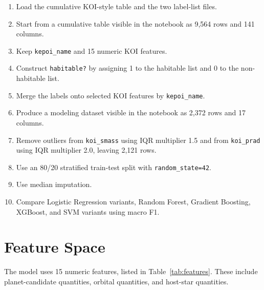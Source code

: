 \documentclass[11pt]{article}
\newcommand{\code}[1]{\texttt{#1}}
\begin{document}
\begin{enumerate}
  \item Load the cumulative KOI-style table and the two label-list files.
  \item Start from a cumulative table visible in the notebook as 9,564 rows and 141 columns.
  \item Keep \code{kepoi\_name} and 15 numeric KOI features.
  \item Construct \code{habitable?} by assigning 1 to the habitable list and 0 to the non-habitable list.
  \item Merge the labels onto selected KOI features by \code{kepoi\_name}.
  \item Produce a modeling dataset visible in the notebook as 2,372 rows and 17 columns.
  \item Remove outliers from \code{koi\_smass} using IQR multiplier 1.5 and from \code{koi\_prad} using IQR multiplier 2.0, leaving 2,121 rows.
  \item Use an 80/20 stratified train-test split with \code{random\_state=42}.
  \item Use median imputation.
  \item Compare Logistic Regression variants, Random Forest, Gradient Boosting, XGBoost, and SVM variants using macro F1.
\end{enumerate}

\section{Feature Space}

The model uses 15 numeric features, listed in Table~\ref{tab:features}. These include planet-candidate quantities, orbital quantities, and host-star quantities.
\end{document}

